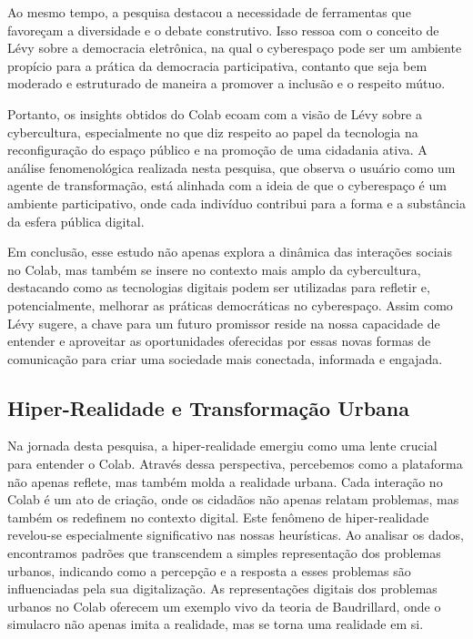 Ao mesmo tempo, a pesquisa destacou a necessidade de ferramentas que favoreçam a diversidade e o debate construtivo. Isso ressoa com o conceito de Lévy sobre a democracia eletrônica, na qual o cyberespaço pode ser um ambiente propício para a prática da democracia participativa, contanto que seja bem moderado e estruturado de maneira a promover a inclusão e o respeito mútuo.

Portanto, os insights obtidos do Colab ecoam com a visão de Lévy sobre a cybercultura, especialmente no que diz respeito ao papel da tecnologia na reconfiguração do espaço público e na promoção de uma cidadania ativa. A análise fenomenológica realizada nesta pesquisa, que observa o usuário como um agente de transformação, está alinhada com a ideia de que o cyberespaço é um ambiente participativo, onde cada indivíduo contribui para a forma e a substância da esfera pública digital.

Em conclusão, esse estudo não apenas explora a dinâmica das interações sociais no Colab, mas também se insere no contexto mais amplo da cybercultura, destacando como as tecnologias digitais podem ser utilizadas para refletir e, potencialmente, melhorar as práticas democráticas no cyberespaço. Assim como Lévy sugere, a chave para um futuro promissor reside na nossa capacidade de entender e aproveitar as oportunidades oferecidas por essas novas formas de comunicação para criar uma sociedade mais conectada, informada e engajada.

\subsection*{Hiper-Realidade e Transformação Urbana}

Na jornada desta pesquisa, a hiper-realidade emergiu como uma lente crucial para entender o Colab. Através dessa perspectiva, percebemos como a plataforma não apenas reflete, mas também molda a realidade urbana. Cada interação no Colab é um ato de criação, onde os cidadãos não apenas relatam problemas, mas também os redefinem no contexto digital. Este fenômeno de hiper-realidade revelou-se especialmente significativo nas nossas heurísticas. Ao analisar os dados, encontramos padrões que transcendem a simples representação dos problemas urbanos, indicando como a percepção e a resposta a esses problemas são influenciadas pela sua digitalização. As representações digitais dos problemas urbanos no Colab oferecem um exemplo vivo da teoria de Baudrillard, onde o simulacro não apenas imita a realidade, mas se torna uma realidade em si.

